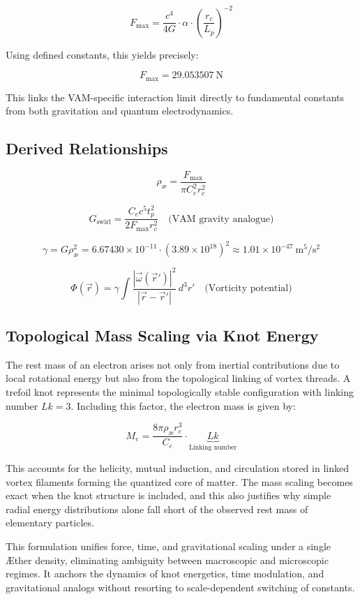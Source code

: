 \[
F_{\text{max}} = \frac{c^4}{4G} \cdot \alpha \cdot \left( \frac{r_c}{L_p} \right)^{-2}
\]

Using defined constants, this yields precisely:

\[
F_{\text{max}} = 29.053507~\text{N}
\]

This links the VAM-specific interaction limit directly to fundamental constants from both gravitation and quantum electrodynamics.





\subsection*{Derived Relationships}

\[
\rho_{\text{\ae}} = \frac{F_{\text{max}}}{\pi C_e^2 r_c^2}
\]

\[
G_\text{swirl} = \frac{C_e c^5 t_p^2}{2 F_{\text{max}} r_c^2} \quad \text{(VAM gravity analogue)}
\]

\[
\gamma = G \rho_{\text{\ae}}^2 = 6.67430 \times 10^{-11} \cdot (3.89 \times 10^{18})^2 \approx 1.01 \times 10^{-47}~\text{m}^5/\text{s}^2
\]

\[
\Phi(\vec{r}) = \gamma \int \frac{|\vec{\omega}(\vec{r}')|^2}{|\vec{r} - \vec{r}'|} \, d^3r' \quad \text{(Vorticity potential)}
\]

\subsection*{Topological Mass Scaling via Knot Energy}

The rest mass of an electron arises not only from inertial contributions due to local rotational energy but also from the topological linking of vortex threads. A trefoil knot represents the minimal topologically stable configuration with linking number \(Lk = 3\). Including this factor, the electron mass is given by:

\[
M_e = \boxed{ \frac{8\pi \rho_{\text{\ae}} r_c^3}{C_e} \cdot \underbrace{Lk}_{\text{Linking number}} }
\]

This accounts for the helicity, mutual induction, and circulation stored in linked vortex filaments forming the quantized core of matter. The mass scaling becomes exact when the knot structure is included, and this also justifies why simple radial energy distributions alone fall short of the observed rest mass of elementary particles.

This formulation unifies force, time, and gravitational scaling under a single Æther density, eliminating ambiguity between macroscopic and microscopic regimes. It anchors the dynamics of knot energetics, time modulation, and gravitational analogs without resorting to scale-dependent switching of constants.


